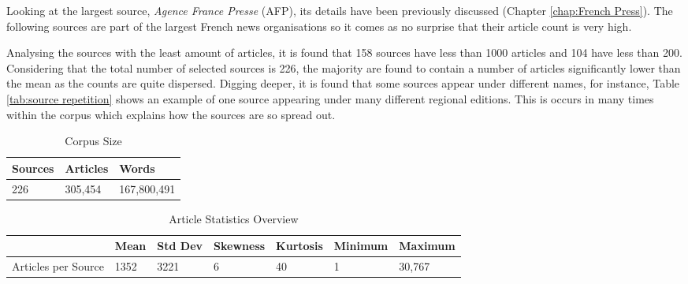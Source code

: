 Looking at the largest source, \emph{Agence France Presse} (AFP), its details have been previously discussed (Chapter \ref{chap:French Press}). The following sources are part of the largest French news organisations so it comes as no surprise that their article count is very high.

Analysing the sources with the least amount of articles, it is found that 158 sources have less than 1000 articles and 104 have less than 200. Considering that the total number of selected sources is 226, the majority are found to contain a number of articles significantly lower than the mean as the counts are quite dispersed. Digging deeper, it is found that some sources appear under different names, for instance, Table \ref{tab:source repetition} shows an example of one source appearing under many different regional editions. This is occurs in many times within the corpus which explains how the sources are so spread out. 

\begin{table}[H]
\centering
\begin{tabular}{lll}
\toprule
Sources & Articles & Words \\ \hline
226 & 305,454 & 167,800,491 \\
\bottomrule
\end{tabular}
\caption{Corpus Size}
\label{tab: corpus size}
\end{table}

\begin{table}[H]
\centering
\begin{tabular}{@{}lllllll@{}}
\toprule
 & Mean & Std Dev & Skewness & Kurtosis & Minimum & Maximum \\ \midrule
Articles per Source & 1352 & 3221 & 6 & 40 & 1 & 30,767 \\ \bottomrule
\end{tabular}
\caption{Article Statistics Overview}
\label{tab:core stat source}
\end{table}


